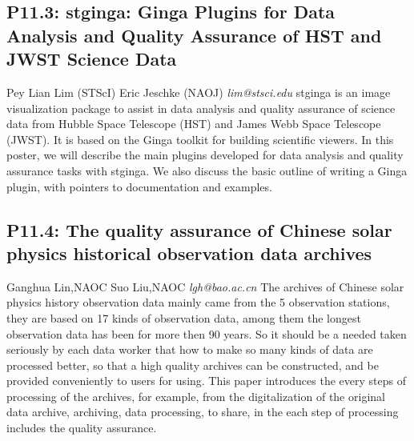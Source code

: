 \documentclass{report}
\begin{document}
\subsection*{P11.3: stginga: Ginga Plugins for Data Analysis and Quality Assurance of HST and JWST Science Data}
\bigskip
Pey Lian Lim (STScI) \newline Eric Jeschke (NAOJ) \newline   \newline   \newline  \newline  \newline\newline
{\it lim@stsci.edu}\newline
\newline\newline
stginga is an image visualization package to assist in data analysis and quality assurance of science data from Hubble Space Telescope (HST) and James Webb Space Telescope (JWST).  It is based on the Ginga toolkit for building scientific viewers. In this poster, we will describe the main plugins developed for data analysis and quality assurance tasks with stginga.  We also discuss the basic outline of writing a Ginga plugin, with pointers to documentation and examples.\newline
\newpage
\subsection*{P11.4: The quality assurance of Chinese solar physics historical observation data archives}
\bigskip
Ganghua Lin,NAOC  \newline Suo Liu,NAOC  \newline   \newline   \newline  \newline  \newline\newline
{\it lgh@bao.ac.cn}\newline
\newline\newline
The archives of Chinese solar physics history observation data mainly came from the 5 observation stations, they are based on 17 kinds of observation data, among them the longest observation data has been for more then 90 years. So it should be a needed taken seriously by each data worker that how to make so many kinds of data are processed better, so that a high quality archives can be constructed, and be provided conveniently to users for using. This paper introduces the every steps of processing of the archives, for example, from the digitalization of the original data archive, archiving, data processing, to share, in the each step of processing includes the quality assurance.\newline
\newpage
\end{document}
